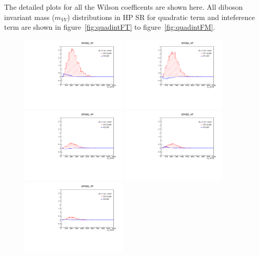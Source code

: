 The detailed plots for all the Wilson coefficents are shown here.
All diboson invariant mass ($m_{VV}$) distributions in HP SR for quadratic term and inteference term are shown in figure~\ref{fig:quadintFT} to figure~\ref{fig:quadintFM}.
\begin{figure}[ht]
    \centering
        \includegraphics[width=0.45\textwidth]{figures/aQGC/FT0_0ptag1pfat0pjet_0ptv_SRVBS_HP_MllJ.pdf}
        \includegraphics[width=0.45\textwidth]{figures/aQGC/FT1_0ptag1pfat0pjet_0ptv_SRVBS_HP_MllJ.pdf}
        \includegraphics[width=0.45\textwidth]{figures/aQGC/FT2_0ptag1pfat0pjet_0ptv_SRVBS_HP_MllJ.pdf}
        \includegraphics[width=0.45\textwidth]{figures/aQGC/FT5_0ptag1pfat0pjet_0ptv_SRVBS_HP_MllJ.pdf}
        \includegraphics[width=0.45\textwidth]{figures/aQGC/FT6_0ptag1pfat0pjet_0ptv_SRVBS_HP_MllJ.pdf}

\end{figure}

